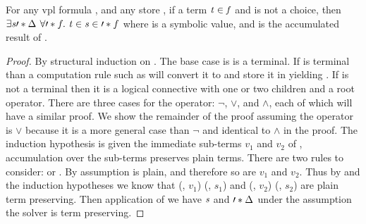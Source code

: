 \begin{lemma}
  For any \ac{vpl} formula \fV, and any store \aStore{}, if a term $\mathit{t}{} \in
  \mathit{f}$ and \tV{} is not a choice, then $\exists\sV{}\prime*{\aStore{}}\ \forall\prime*{f}.\ \tV
  \in \sV{} \in \prime*{f}$ where \sV{} is a symbolic value, and  is
  the accumulated result of \fV{}.
\end{lemma}
%
\begin{proof}
  By structural induction on \tV{}. The base case is \tV{} is a terminal. If
  \tV{} is terminal than a computation rule such as \acRef{} will convert it to
  \sV{} and store it in \aStore{} yielding \prime*{\aStore{}}. If \tV{} is not a
  terminal then it is a logical connective with one or two children and a root
  operator. There are three cases for the operator: $\neg$, $\vee$, and
  $\wedge$, each of which will have a similar proof. We show the remainder of
  the proof assuming the operator is $\vee$ because it is a more general case
  than $\neg$ and identical to $\wedge$ in the proof. The induction hypothesis
  is given the immediate sub-terms $v_{1}$ and $v_{2}$ of \tV{}, accumulation
  over the sub-terms preserves plain terms. There are two rules to consider:
  \acOrS{} or \acOrV{}. By assumption \tV{} is plain, and therefore so are
  $v_{1}$ and $v_{2}$. Thus by \acOrS{} and the induction hypotheses we know
  that (\aStore{}, $v_1$) \accumulation (, $s_1$) and (,
  $v_2$) \accumulation (, $s_2$) are plain term preserving. Then
  application of \por{} we have $\mathit{s}$ and $\prime*{\Delta_{}}$ under the
  assumption the solver is term preserving.
\end{proof}


